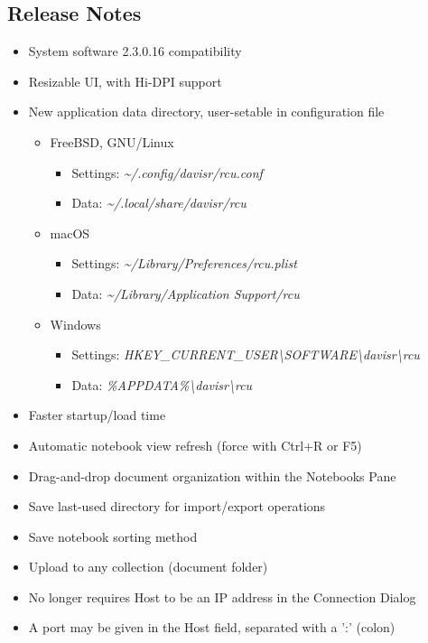 \subsection{Release Notes}
\begin{itemize}
\item{System software 2.3.0.16 compatibility}
\item{Resizable UI, with Hi-DPI support}
\item{New application data directory, user-setable in configuration file}
  \begin{itemize}
  \item{FreeBSD, GNU/Linux}
    \begin{itemize}
    \item[]{Settings: \textit{\textasciitilde/.config/davisr/rcu.conf}}
    \item[]{Data: \textit{\textasciitilde/.local/share/davisr/rcu}}
    \end{itemize}
  \item{macOS}
    \begin{itemize}
    \item[]{Settings: \textit{\textasciitilde/Library/Preferences/rcu.plist}}
    \item[]{Data: \textit{\textasciitilde/Library/Application Support/rcu}}
    \end{itemize}
  \item{Windows}
    \begin{itemize}
    \item[]{Settings: \textit{HKEY\_CURRENT\_USER\textbackslash SOFTWARE\textbackslash davisr\textbackslash rcu}}
    \item[]{Data: \textit{\%APPDATA\%\textbackslash davisr\textbackslash rcu}}
    \end{itemize}
  \end{itemize}
\item{Faster startup/load time}
\item{Automatic notebook view refresh (force with Ctrl+R or F5)}
\item{Drag-and-drop document organization within the Notebooks Pane}
\item{Save last-used directory for import/export operations}
\item{Save notebook sorting method}
\item{Upload to any collection (document folder)}
\item{No longer requires Host to be an IP address in the Connection Dialog}
\item{A port may be given in the Host field, separated with a ':' (colon)}

\end{itemize}
